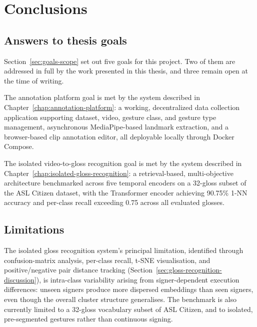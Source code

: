 
\section{Conclusions}
\label{chap:conclusions}

\subsection{Answers to thesis goals}
\label{sec:conclusions-goals}

Section~\ref{sec:goals-scope} set out five goals for this project. Two of them
are addressed in full by the work presented in this thesis, and three remain
open at the time of writing.

The annotation platform goal is met by the system described in
Chapter~\ref{chap:annotation-platform}: a working, decentralized data
collection application supporting dataset, video, gesture class, and gesture
type management, asynchronous MediaPipe-based landmark extraction, and a
browser-based clip annotation editor, all deployable locally through Docker
Compose.

The isolated video-to-gloss recognition goal is met by the system described in
Chapter~\ref{chap:isolated-gloss-recognition}: a retrieval-based, multi-objective
architecture benchmarked across five temporal encoders on a 32-gloss subset of
the ASL Citizen dataset, with the Transformer encoder achieving 90.75\% 1-NN
accuracy and per-class recall exceeding 0.75 across all evaluated glosses.


\subsection{Limitations}
\label{sec:conclusions-limitations}

The isolated gloss recognition system's principal limitation, identified
through confusion-matrix analysis, per-class recall, t-SNE visualisation, and
positive/negative pair distance tracking
(Section~\ref{sec:gloss-recognition-discussion}), is intra-class variability
arising from signer-dependent execution differences: unseen signers produce
more dispersed embeddings than seen signers, even though the overall cluster
structure generalises. The benchmark is also currently limited to a 32-gloss
vocabulary subset of ASL Citizen, and to isolated, pre-segmented gestures rather
than continuous signing.

